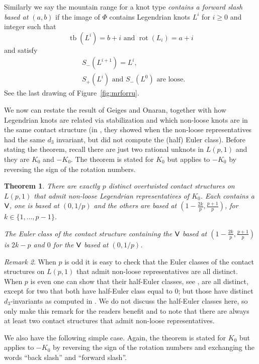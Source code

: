 \documentclass[11pt]{amsart}
\theoremstyle{plain}
\newtheorem{theorem}{Theorem}
\theoremstyle{definition}
\theoremstyle{remark}
\newtheorem{remark}[theorem]{Remark}
\numberwithin{theorem}{section}
\newcommand{\dfn}[1]{{\em #1}}        %
\DeclareMathOperator\tb{tb}                   %
\DeclareMathOperator\rot{rot}                 %
\begin{document}
Similarly we say the mountain range for a knot type \dfn{contains a forward slash based at $(a,b)$} if the image of $\Phi$ contains Legendrian knots $L^i$ for $i\geq 0$ and integer such that
\[
\tb(L^i)= b+i \text{ and } \rot(L_i)=a+i
\]
and satisfy 
\begin{align*}
  &S_-(L^{i+1})=L^i,\\ 
  &S_+(L^i) \text{ and } S_-(L^0) \text{ are loose.}
\end{align*}
See the last drawing of Figure~\ref{fig:mrforru}.


We now can restate the result of Geiges and Onaran, together with how Legendrian knots are related via stabilization and which non-loose knots are in the same contact structure (in \cite{GeigesOnaran15}, they showed when the non-loose representatives had the same $d_3$ invariant, but did not compute the (half) Euler class).  Before stating the theorem, recall there are just two rational unknots in $L(p,1)$ and they are $K_0$ and $-K_0$. The theorem is stated for $K_0$ but applies to $-K_0$ by reversing the sign of the rotation numbers. 
\begin{theorem}\label{Lp1}
There are exactly $p$ distinct overtwisted contact structures on $L(p,1)$ that admit non-loose Legendrian representatives of $K_0$. Each contains a $\normalfont\textsf{V}$, one is based at $(0,1/p)$ and the others are based at $\left(1-\frac{2k}p, \frac{p+1}p\right)$, for $k\in \{1,\ldots, p-1\}$. 

The Euler class of the contact structure containing the $\normalfont\textsf{V}$ based at $\left(1-\frac{2k}p, \frac{p+1}p\right)$ is $2k-p$ and $0$ for the $\normalfont\textsf{V}$ based at $(0,1/p)$. 
\end{theorem}

\begin{remark}
When $p$ is odd it is easy to check that the Euler classes of the contact structures on $L(p,1)$ that admit non-loose representatives are all distinct. When $p$ is even one can show that their half-Euler classes, see \cite{Gompf98}, are all distinct, except for two that both have half-Euler class equal to $0$; but those have distinct $d_3$-invariants as computed in \cite{GeigesOnaran15}. We do not discuss the half-Euler classes here, so only make this remark for the readers benefit and to note that there are always at least two contact structures that admit non-loose representatives. 
\end{remark}

We also have the following simple case. Again, the theorem is stated for $K_0$ but applies to $-K_0$ by reversing the sign of the rotation numbers and exchanging the words ``back slash'' and ``forward slash''. 
\end{document}
